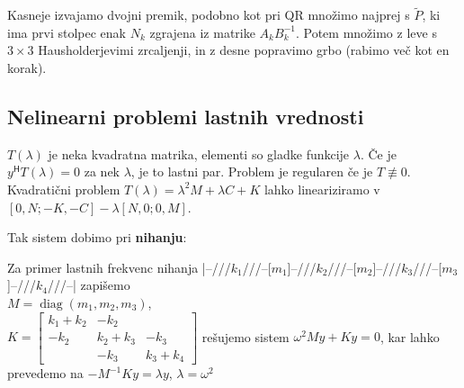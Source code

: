 \documentclass[a4paper,10pt]{article}
\theoremstyle{definition}
\renewcommand{\H}{\mathsf{H}\!}
\DeclareMathOperator{\diag}{diag}
\begin{document}
Kasneje izvajamo dvojni premik, podobno kot pri QR množimo najprej s
$\tilde{P}$, ki ima prvi stolpec enak $N_k$ zgrajena iz matrike $A_kB_k^{-1}$.
Potem množimo z leve s $3 \times 3$ Hausholderjevimi zrcaljenji, in z desne
popravimo grbo (rabimo več kot en korak).

\subsection*{Nelinearni problemi lastnih vrednosti}
$T(\lambda)$ je neka kvadratna matrika, elementi so gladke funkcije $\lambda$.
Če je $y^\H T(\lambda) = 0$ za nek $\lambda$, je to lastni par. Problem je
regularen če je $T \not\equiv 0$. Kvadratični problem $T(\lambda) = \lambda^2M +
\lambda C + K$ lahko lineariziramo v $[0,N; -K,-C] - \lambda[N,0; 0,M]$.

Tak sistem dobimo pri \textbf{nihanju}:

Za primer lastnih frekvenc nihanja
|--///$k_1$///--[$m_1$]--///$k_2$///--[$m_2$]--///$k_3$///--[$m_3$]--///$k_4$///--| zapišemo \\
$M=\diag(m_1,m_2,m_3)$,\\
$ K=
\begin{bmatrix}
k_1+k_2 & -k_2&\\-k_2 & k_2+k_3 & -k_3\\ &-k_3&k_3+k_4
\end{bmatrix}$
rešujemo sistem $\omega^2My+Ky=0$, kar lahko prevedemo na
$-M^{-1}Ky=\lambda y$, $\lambda=\omega^2$
\end{document}
